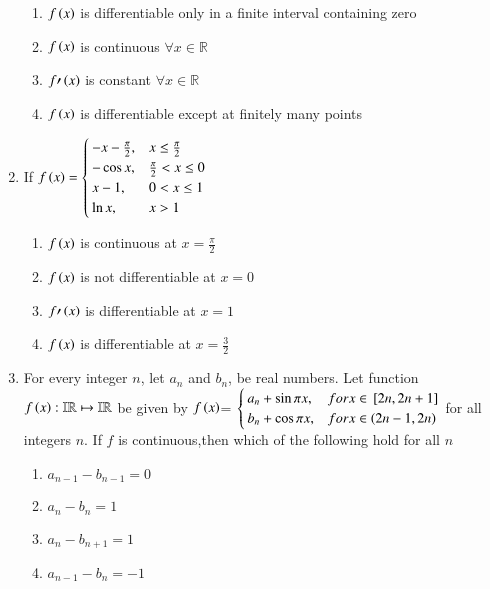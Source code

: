 \documentclass[journal]{IEEEtran}
\numberwithin{equation}{enumi}
\numberwithin{figure}{enumi}
\begin{document}
\begin{enumerate}
    \hfill{}
    
    \begin{enumerate}
	\item $f\left(x\right)$ is differentiable only in a finite interval containing zero 
        \item $f\left(x\right)$ is continuous $\forall x\in \mathbb{R}$
	\item $f{\prime}\left(x\right)$ is constant $\forall x\in \mathbb{R}$
        \item $f\left(x\right)$ is differentiable except at finitely many points 
    \end{enumerate}


    \item 
    If $f\left(x\right)= 
    \begin{cases}
        -x-\frac{\pi}{2}, & x\leq \frac{\pi}{2} \\
        -\cos x, & \frac{\pi}{2}<x\leq 0 \\
        x-1, & 0<x\leq1 \\
        \ln x, & x>1
    \end{cases}$ 

    \hfill{}
    
    \begin{enumerate}
        \item $f\left(x\right)$ is continuous at $x=\frac{\pi}{2}$
        \item $f\left(x\right)$ is not differentiable at $x=0$
	\item $f{\prime}\left(x\right)$ is differentiable at $x=1$
        \item $f\left(x\right)$ is differentiable at $x=\frac{3}{2}$
    \end{enumerate}

    \item 
    For every integer $n$, let $a_n$ and $b_n$, be real numbers. Let function $f\left(x\right): \mathbb{IR} \mapsto \mathbb{IR}$ be given by
    $f\left(x\right)$= 
    $\begin{cases}
       a_n+\sin\pi x, & for x\in {}\left[2n,2n+1\right] \\
       b_n+\cos\pi x, & for x\in \left(2n-1,2n\right)
    \end{cases}$
    for all integers $n$. If $f$ is continuous,then which of the following hold for all $n$ 

    \hfill{}
    
    \begin{enumerate}        
        \item $a_{n-1}-b_{n-1}=0$ 
        \item $a_n-b_n=1$ 
        \item $a_n-b_{n+1}=1$ 
        \item $a_{n-1}-b_n=-1$ 
    \end{enumerate}



\end{enumerate}
\end{document}
